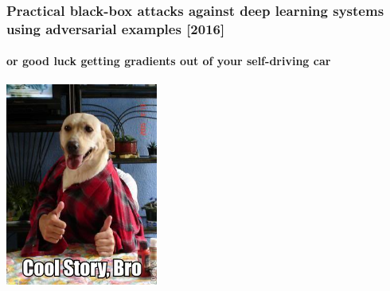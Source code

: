 \documentclass[9pt]{beamer}
\begin{document}
\begin{frame}
  \frametitle{{\small Practical black-box attacks against deep learning
    systems using adversarial examples [2016]}}

  \framesubtitle{or good luck getting gradients out of your
    self-driving car}

  \begin{center}
    \includegraphics[width = 5cm]{images/cool_story_bro_1.jpg}
  \end{center}

\end{frame}
\end{document}
